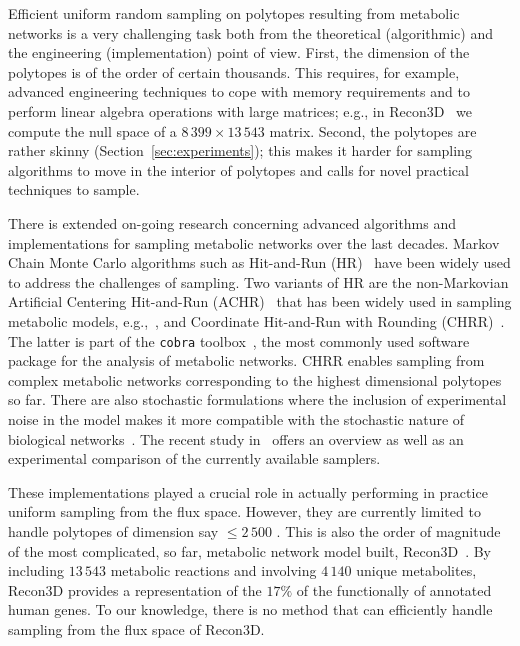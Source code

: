    Efficient uniform random sampling on polytopes resulting from metabolic
   networks is a very challenging task  both from the theoretical (algorithmic)
   and the engineering (implementation)  point of view.
   First, the dimension of the polytopes is of the order of certain thousands. This
   requires, for example, advanced engineering techniques to cope with memory
   requirements and to perform linear algebra operations with large matrices;
   e.g., in
   Recon3D~\citep{brunk2018recon3d} we compute the null space of a
   $8\,399 \times 13\,543$ matrix. Second, the polytopes are rather skinny
   (Section~\ref{sec:experiments}); this makes it harder for sampling algorithms to
   move in the interior of polytopes and calls for novel practical techniques to
   sample.

   There is extended on-going research concerning advanced algorithms and
   implementations for sampling metabolic networks over the last decades. Markov
   Chain Monte Carlo algorithms such as Hit-and-Run (HR)~\citep{smith84} have been
   widely used to address the challenges of sampling. Two variants of HR are the
   non-Markovian Artificial Centering Hit-and-Run
   (ACHR)~\citep{kaufman1998direction} that has been widely used in sampling
   metabolic models, e.g.,~\citep{Saa16}, and Coordinate Hit-and-Run with Rounding
   (CHRR)~\citep{Haraldsdottir17}. 
   The latter is part of the \texttt{cobra} toolbox~\citep{heirendt2019creation}, the most commonly used software package for the analysis of metabolic networks. 
   CHRR enables sampling from complex metabolic
   networks corresponding to the highest dimensional polytopes so far. There are
   also stochastic formulations where the inclusion of experimental noise in the
   model makes it more compatible with the stochastic nature of biological
   networks~\citep{MacGillivray17}. The recent study in~\citep{fallahi2020comparison}
   offers an overview as well as an experimental comparison of the currently
   available samplers.

   These implementations played a crucial role in actually performing in practice
   uniform sampling from the flux space. However, they are currently limited to
   handle polytopes of dimension say $\leq 2\, 500$ \citep{fallahi2020comparison,
   Haraldsdottir17}. This is also the order of magnitude of the most
   complicated, so far, metabolic network model built,
   Recon3D~\citep{brunk2018recon3d}. By including $13\,543$ metabolic reactions and
   involving $4 \,140$ unique metabolites, Recon3D provides a representation of the
   $17\%$ of the functionally of annotated human genes. To our knowledge, there is
   no method that can efficiently handle sampling from the flux space of Recon3D.

